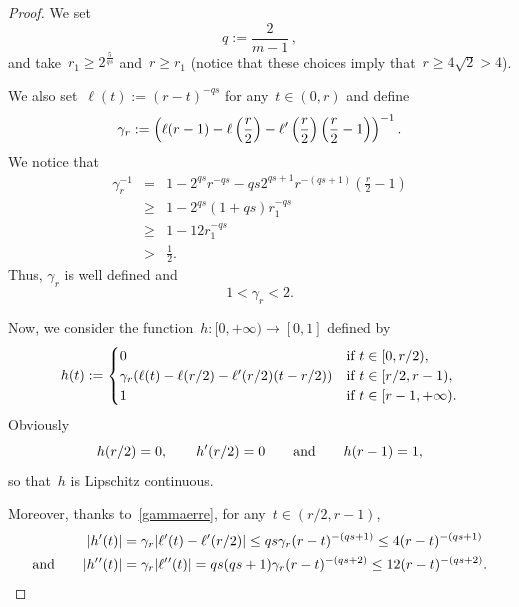 \documentclass[10pt,a4paper]{amsart}
\numberwithin{equation}{section}
\begin{document}
\begin{proof}
We set
\begin{equation}\label{err1}
q:=\frac{2}{m-1}\,,
\end{equation}
and take~$ r_1 \geq 2^{\frac{5}{qs}}$ and~$r \geq r_1$
(notice that these choices imply that~$r\ge 4\sqrt{2}>4$).

We also set~$\ell(t):= (r-t)^{-qs}$ for any~$t \in (0,r)$ and define
\begin{equation*}
\gamma_r := \left(\ell(r-1)-\ell\left(\frac{r}2\right)-
\ell\rq{}\left(\frac{r}2\right)\left(\frac{r}2-1\right)\right)^{-1}.
\end{equation*}
We notice that
\begin{eqnarray*}
\gamma_r^{-1}& = & 1 - 2^{qs}r^{-qs} - qs 2^{qs+1} r^{-(qs+1)}\left(\frac{r}{2}-1\right)\\
& \geq & 1-2^{qs}(1+qs)r_1^{-qs}\\
&\geq & 1- 12r_1^{-qs}\\ 
& > & \frac{1}{2}.
\end{eqnarray*}
Thus, $\gamma_r$ is well defined and
\begin{equation}\label{gammaerre}
1 <\gamma_r < 2.
\end{equation}

Now, we consider the function~$h:[0,+\infty) \to [0,1]$ defined by
\begin{equation}\label{tr4egfhdjgher5u4ty3nfdsu4y653}
h(t):= \begin{cases}
0 &\mbox{if} \ t \in [0,r/2),\\
\gamma_r (\ell(t)-\ell(r/2)-\ell\rq{}(r/2)(t-r/2))  &\mbox{if} \  t \in [r/2,r-1), \\
1  &\mbox{if} \ t \in[r-1,+\infty).
\end{cases}
\end{equation}
Obviously
$$
h(r/2)=0, \qquad h\rq{}(r/2)=0 \qquad\mbox{and}\qquad h(r-1)=1,
$$
so that~$h$ is Lipschitz continuous.

Moreover, thanks to~\eqref{gammaerre}, for any~$t \in (r/2,r-1)$,
\begin{equation}\label{pesderiv}
\begin{split}
|h\rq{}(t)| & =  \gamma_r |\ell\rq{}(t)-\ell\rq{}(r/2) | \leq qs \gamma_r (r-t)^{-(qs+1)}\leq 4 (r-t)^{-(qs+1)} \\\mbox{and}\qquad
| h\rq{}\rq{}(t) | &= \gamma_r |\ell\rq{}\rq{}(t) |= qs (qs+1)\gamma_r (r-t)^{-(qs+2)} \leq 12 (r-t)^{-(qs+2)}.
\end{split}
\end{equation}


\end{proof}
\end{document}

